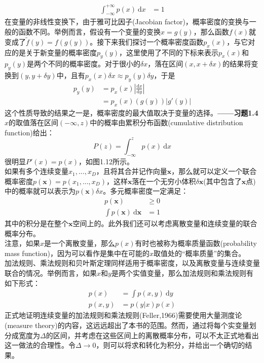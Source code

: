 \documentclass[b5paper]{book}
\numberwithin{equation}{chapter}
\begin{document}
{\begin{align}
		\int_{-\infty}^{+\infty}p(x)\ \mathrm{d}x &= 1
	\end{align}
	\indent 在变量的非线性变换下，由于雅可比因子(Jacobian factor)，概率密度的变换与一般的函数不同。举例而言，假设有一个变量的变换$x=g(y)$，那么函数$f(x)$就变成了$\widetilde{f}(y)=f(g(y))$。接下来我们探讨一个概率密度函数$p_x(x)$，与它对应的是关于新变量的概率密度$p_y(y)$，这里使用了不同的下标来表示$p_x(x)$和$p_y(y)$是两个不同的概率密度。对于很小的$\delta x$，落在区间$(x,x+\delta x)$的结果将变换到$(y,y+\delta y)$中，且有$p_x(x)\delta x\approx p_y(y)\delta y$，于是
	\begin{equation}
		\begin{split}
			p_y(y)&=p_x(x)\left|\frac{\mathrm{d}x}{\mathrm{d}y}\right|\\
			&=p_x(x)(g(y))\left| g'(y) \right|
		\end{split}
	\end{equation}
	\indent 这个性质导致的结果之一是，概率密度的最大值取决于变量的选择。\color{red}\textbf{——习题1.4}\color{black}\\
	\indent $x$的取值落在区间$(-\infty,z)$中的概率由累积分布函数(cumulative distribution function)给出：
	\begin{equation}
		P(z)=\int_{-\infty}^{z}p(x)\ \mathrm{d}x
	\end{equation}
	\indent 很明显$P'(x)=p(x)$，如图1.12所示。\\
	\indent 如果有多个连续变量$x_1,...,x_D$，且将其合并记作向量$\mathbf{x}$，那么就可以定义一个联合概率密度$p(\mathbf{x})=p(x_1,...,x_D)$，这样$\mathbf{x}$落在一个无穷小体积$\delta \mathbf{x}$(其中包含了$\mathbf{x}$点)中的概率就可以表示为$p(\mathbf{x})\delta x$。多元概率密度一定满足：
	\begin{align}
		p(\mathbf{x}) &\geqslant 0 \\
		\int p(\mathbf{x})\  \mathrm{d} \mathbf{x} &= 1
	\end{align}
	\indent 其中的积分是在整个$\mathbf{x}$空间上的。此外我们还可以考虑离散变量和连续变量的联合概率分布。\\
	\indent 注意，如果$x$是一个离散变量，那么$p(x)$有时也被称为概率质量函数(probability mass function)，因为可以看作是集中在可能的$x$取值处的“概率质量”的集合。\\
	\indent 加法规则、乘法规则和贝叶斯定理同样适用于概率密度，以及离散变量与连续变量联合的情况。举例而言，如果$x$和$y$是两个实值变量，那么加法规则和乘法规则有如下形式：
	\begin{align}
		p(x)&=\int p(x,y) \ \mathrm{d} y \\
		p(x,y)&=p(y|x)p(x)
	\end{align}
	正式地证明连续变量的加法规则和乘法规则(Feller,1966)需要使用大量测度论(measure theory)的内容，这远远超出了本书的范围。然而，通过将每个实变量划分成宽度为$\Delta$的区间，并考虑在这些区间上的离散概率分布，可以不太正式地看出这一做法的合理性。令$\Delta \rightarrow 0$，则可以将求和转化为积分，并给出一个确切的结果。
	}
\end{document}
